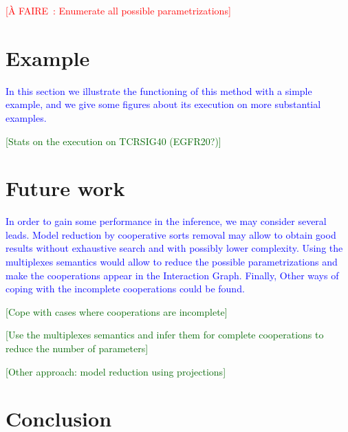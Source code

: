 \documentclass[fleqn]{llncs}
\newcommand{\afaire}[1]{\textcolor{red}{[À FAIRE~: #1]}}
\newcommand{\resume}[1]{\textcolor{blue}{#1}}
\newcommand{\todo}[1]{\textcolor{darkgreen}{[#1]}}
\begin{document}
\afaire{Enumerate all possible parametrizations}



\section{Example}
\resume{In this section we illustrate the functioning of this method with a simple example, and we give some figures about its execution on more substantial examples.}

\todo{Stats on the execution on TCRSIG40 (EGFR20?)}



\section{Future work}
\resume{In order to gain some performance in the inference, we may consider several leads. Model reduction by cooperative sorts removal may allow to obtain good results without exhaustive search and with possibly lower complexity. Using the multiplexes semantics would allow to reduce the possible parametrizations and make the cooperations appear in the Interaction Graph. Finally, Other ways of coping with the incomplete cooperations could be found.}

\todo{Cope with cases where cooperations are incomplete}

\todo{Use the multiplexes semantics and infer them for complete cooperations to reduce the number of parameters}

\todo{Other approach: model reduction using projections}



\section{Conclusion}
\end{document}
